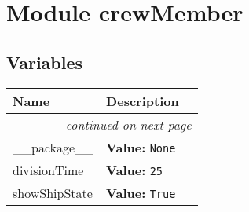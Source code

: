 %
%
%


\section{Module crewMember}

    \label{crewMember}


  \subsection{Variables}

    \vspace{-1cm}
\hspace{\varindent}\begin{longtable}{|p{\varnamewidth}|p{\vardescrwidth}|l}
\cline{1-2}
\cline{1-2} \centering \textbf{Name} & \centering \textbf{Description}& \\
\cline{1-2}
\endhead\cline{1-2}\multicolumn{3}{r}{\small\textit{continued on next page}}\\\endfoot\cline{1-2}
\endlastfoot\raggedright \_\-\_\-p\-a\-c\-k\-a\-g\-e\-\_\-\_\- & \raggedright \textbf{Value:} 
{\tt None}&\\
\cline{1-2}
\raggedright d\-i\-v\-i\-s\-i\-o\-n\-T\-i\-m\-e\- & \raggedright \textbf{Value:} 
{\tt 25}&\\
\cline{1-2}
\raggedright s\-h\-o\-w\-S\-h\-i\-p\-S\-t\-a\-t\-e\- & \raggedright \textbf{Value:} 
{\tt True}&\\
\cline{1-2}
\end{longtable}



